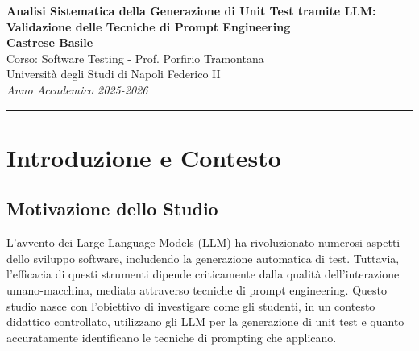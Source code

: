 \documentclass[a4paper,12pt]{article}
\begin{document}
\begin{center}
    \textbf{\Large Analisi Sistematica della Generazione di Unit Test tramite LLM:\\Validazione delle Tecniche di Prompt Engineering} \\
    \vspace{0.3cm}
    \textbf{Castrese Basile} \\
    Corso: Software Testing - Prof. Porfirio Tramontana \\
    Università degli Studi di Napoli Federico II \\
    \vspace{0.3cm}
    \textit{Anno Accademico 2025-2026} \\
    \vspace{0.5cm}
    \rule{\textwidth}{0.4pt}
\end{center}

\begin{abstract}
Questo documento presenta un'analisi empirica sull'utilizzo dei Large Language Models (LLM) per la generazione automatica di unit test in Java, con particolare focus sulla validazione delle tecniche di prompt engineering dichiarate dagli studenti. Attraverso lo sviluppo di uno strumento web dedicato alla validazione manuale sistematica, sono stati analizzati 225 prompt prodotti da 75 studenti, rivelando significative discrepanze tra le tecniche percepite e quelle effettivamente utilizzate. Lo studio evidenzia l'importanza della validazione umana e identifica pattern ricorrenti nell'interazione con gli LLM per task di testing software.
\end{abstract}

\section{Introduzione e Contesto}

\subsection{Motivazione dello Studio}
L'avvento dei Large Language Models (LLM) ha rivoluzionato numerosi aspetti dello sviluppo software, includendo la generazione automatica di test. Tuttavia, l'efficacia di questi strumenti dipende criticamente dalla qualità dell'interazione umano-macchina, mediata attraverso tecniche di prompt engineering. Questo studio nasce con l'obiettivo di investigare come gli studenti, in un contesto didattico controllato, utilizzano gli LLM per la generazione di unit test e quanto accuratamente identificano le tecniche di prompting che applicano.
\end{document}
